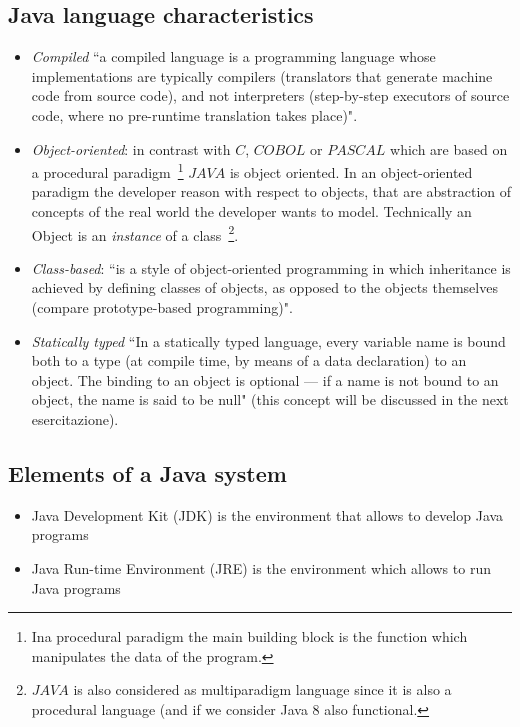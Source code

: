 \documentclass{article}
\theoremstyle{definition}
\begin{document}
\subsection{Java language characteristics}
\begin{itemize}
\item \emph{Compiled} ``a compiled language is a programming language whose implementations are typically compilers (translators that generate machine code from source code), and not interpreters (step-by-step executors of source code, where no pre-runtime translation takes place)"\cite{WikipediaCompiled}.
\item \emph{Object-oriented}: in contrast with $C$, $COBOL$ or $PASCAL$ which are based on a procedural paradigm~\footnote{Ina procedural paradigm the main building block is the function which manipulates the data of the program.} $JAVA$ is object oriented. In an object-oriented paradigm the developer reason with respect to objects, that are abstraction of concepts of the real world the developer wants to model. Technically an Object is an \emph{instance} of a class~\footnote{$JAVA$ is also considered as multiparadigm language since it is also a procedural language (and if we consider Java 8 also functional.}.
\item \emph{Class-based}: ``is a style of object-oriented programming in which inheritance is achieved by defining classes of objects, as opposed to the objects themselves (compare prototype-based programming)"\cite{Wikipedia}.
\item \emph{Statically typed} ``In a statically typed language, every variable name is bound both
to a type (at compile time, by means of a data declaration) to an object.
The binding to an object is optional — if a name is not bound to an object, the name is said to be null"\cite{StaticallyTyped} (this concept will be discussed in the next esercitazione).
\end{itemize}

\subsection{Elements of a Java system}
\begin{itemize}
\item Java Development Kit (JDK) is the environment that allows to develop  Java programs
\item Java Run-time Environment (JRE) is the environment which allows to run Java programs
\end{itemize}
\end{document}
